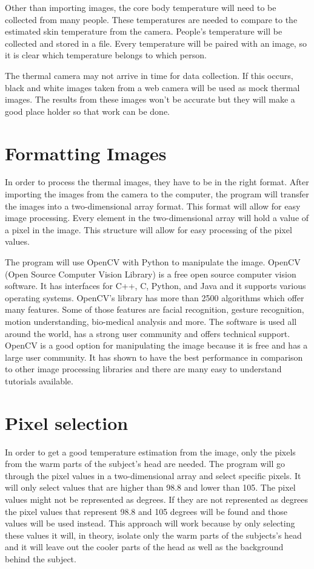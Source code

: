 \documentclass[onecolumn, draftclsnofoot,10pt, compsoc]{IEEEtran}
\begin{document}
Other than importing images, the core body temperature will need to be collected from many people. These temperatures are needed to compare to the estimated skin temperature from the camera. People’s temperature will be collected and stored in a file. Every temperature will be paired with an image, so it is clear which temperature belongs to which person. 

The thermal camera may not arrive in time for data collection. If this occurs, black and white images taken from a web camera will be used as mock thermal images. The results from these images won't be accurate but they will make a good place holder so that work can be done. 


\section{Formatting Images}

In order to process the thermal images, they have to be in the right format. After importing the images from the camera to the computer, the program will transfer the images into a two-dimensional array format. This format will allow for easy image processing. Every element in the two-dimensional array will hold a value of a pixel in the image. This structure will allow for easy processing of the pixel values. 

The program will use OpenCV with Python to manipulate the image. OpenCV (Open Source Computer Vision Library) is a free open source computer vision software. It has interfaces for C++, C, Python, and Java and it supports various operating systems. OpenCV’s library has more than 2500 algorithms which offer many features. Some of those features are facial recognition, gesture recognition, motion understanding, bio-medical analysis and more. The software is used all around the world, has a strong user community and offers technical support. OpenCV is a good option for manipulating the image because it is free and has a large user community. It has shown to have the best performance in comparison to other image processing libraries and there are many easy to understand tutorials available.\cite{ClaudeTech}

\section{Pixel selection}
In order to get a good temperature estimation from the image, only the pixels from the warm parts of the subject's head are needed. The program will go through the pixel values in a two-dimensional array and select specific pixels. It will only select values that are higher than 98.8 and lower than 105. The pixel values might not be represented as degrees. If they are not represented as degrees the pixel values that represent 98.8 and 105 degrees will be found and those values will be used instead. This approach will work because by only selecting these values it will,  in theory, isolate only the warm parts of the subjects’s head and it will leave out the cooler parts of the head as well as the background behind the subject. 
\end{document}
